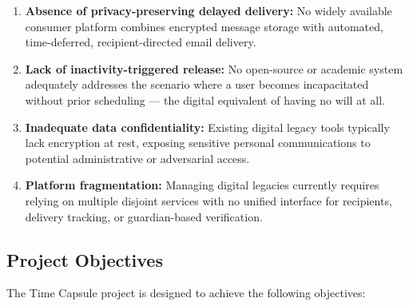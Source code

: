 \documentclass[12pt, a4paper]{article}
\begin{document}
\begin{enumerate}[label=\arabic*.]
  \item \textbf{Absence of privacy-preserving delayed delivery:} No widely available consumer platform combines encrypted message storage with automated, time-deferred, recipient-directed email delivery.
  \item \textbf{Lack of inactivity-triggered release:} No open-source or academic system adequately addresses the scenario where a user becomes incapacitated without prior scheduling — the digital equivalent of having no will at all.
  \item \textbf{Inadequate data confidentiality:} Existing digital legacy tools typically lack encryption at rest, exposing sensitive personal communications to potential administrative or adversarial access.
  \item \textbf{Platform fragmentation:} Managing digital legacies currently requires relying on multiple disjoint services with no unified interface for recipients, delivery tracking, or guardian-based verification.
\end{enumerate}

\subsection{Project Objectives}

The Time Capsule project is designed to achieve the following objectives:
\end{document}
